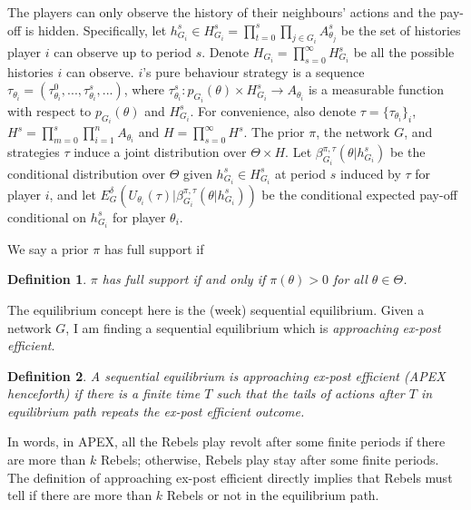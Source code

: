 \documentclass[12pt,letter]{article}
\newtheorem{definition}{Definition}[section]
\theoremstyle{definition}
\theoremstyle{remark}
\theoremstyle{claim}
\begin{document}
The players can only observe the history of their neighbours' actions and the pay-off is hidden. Specifically, let $h^s_{G_i}\in H^s_{G_i}=\prod^s_{t=0}\prod_{j\in G_i}A^s_{\theta_j}$ be the set of histories player $i$ can observe up to period $s$. Denote $H_{G_i}=\prod^{\infty}_{s=0}H^s_{G_i}$ be all the possible histories $i$ can observe. $i$'s pure behaviour strategy is a sequence $\tau_{\theta_i}=(\tau^0_{\theta_i},...,\tau^s_{\theta_i},...)$, where $\tau^s_{\theta_i}: p_{G_i}(\theta)\times H^s_{G_i}\rightarrow A_{\theta_i}$ is a  measurable function with respect to $p_{G_i}(\theta)$ and $H^s_{G_i}$. For convenience, also denote $\tau=\{\tau_{\theta_i}\}_i$,  $H^s=\prod^s_{m=0}\prod^n_{i=1}A_{\theta_i}$ and $H=\prod^{\infty}_{s=0}H^s$. The prior $\pi$, the network $G$, and strategies $\tau$ induce a joint distribution over $\Theta\times H$. Let 
$\beta^{\pi,\tau}_{G_i}(\theta|h^{s}_{G_i})$
be the conditional distribution over $\Theta$ given $h^{s}_{G_i}\in H^s_{G_i}$ at period $s$ induced by $\tau$ for player $i$, and let
$E^{\delta}_G(U_{\theta_i}(\tau)|\beta^{\pi,\tau}_{G_i}(\theta|h^{s}_{G_i}))$
be the conditional expected pay-off conditional on $h^{s}_{G_i}$ for player ${\theta_i}$.

We say a prior $\pi$ has full support if  
\begin{definition}
$\pi$ has full support if and only if $\pi(\theta)>0$ for all $\theta\in \Theta$.
\end{definition}

The equilibrium concept here is the (week) sequential equilibrium. Given a network $G$, I am finding a sequential equilibrium which is \textit{approaching ex-post efficient}. 

\begin{definition}\label{Def_expost_efficient}
A sequential equilibrium is approaching ex-post efficient (APEX henceforth) if there is a finite time $T$ such that the tails of actions after $T$ in equilibrium path repeats the ex-post efficient outcome.
\end{definition}

In words, in APEX, all the Rebels play revolt after some finite periods if there are more than $k$ Rebels; otherwise, Rebels play stay after some finite periods. The definition of approaching ex-post efficient directly implies that Rebels must tell if there are more than $k$ Rebels or not in the equilibrium path.
\end{document}
